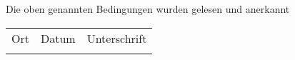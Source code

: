 \begin{Form}
	Die oben genannten Bedingungen wurden gelesen und anerkannt\\
	
	\begin{tabu}{XXX[2]}
		Ort & Datum & Unterschrift \\
		\TextField[name=SIGN_ORT]{} & \TextField[name=SIGN_DATUM]{} & \TextField[name=SIGN]{} \\
	\end{tabu}
	
	
\end{Form}